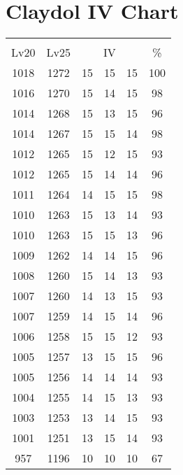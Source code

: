 \documentclass{article}%
\begin{document}
%
\normalsize%
\section{Claydol IV Chart}%
\label{sec:Claydol IV Chart}%
\renewcommand{\arraystretch}{1.5}%
\begin{tabular}{|c|c|c|c|c|c|}%
\hline%
\multicolumn{6}{|c|}{\textcolor{white}{ 
\linebreak{Claydol}
}%
\cellcolor{black}}\\%
\multicolumn{1}{|c}{Lv20}&\multicolumn{1}{c|}{Lv25}&\multicolumn{3}{c|}{IV}&\multicolumn{1}{|c|}{\%}\\%
\hline%
\rowcolor{color100}%
1018&1272&15&15&15&100\\%
\hline%
\rowcolor{color98}%
1016&1270&15&14&15&98\\%
\hline%
\rowcolor{color96}%
1014&1268&15&13&15&96\\%
\hline%
\rowcolor{color98}%
1014&1267&15&15&14&98\\%
\hline%
\rowcolor{color93}%
1012&1265&15&12&15&93\\%
\hline%
\rowcolor{color96}%
1012&1265&15&14&14&96\\%
\hline%
\rowcolor{color98}%
1011&1264&14&15&15&98\\%
\hline%
\rowcolor{color93}%
1010&1263&15&13&14&93\\%
\hline%
\rowcolor{color96}%
1010&1263&15&15&13&96\\%
\hline%
\rowcolor{color96}%
1009&1262&14&14&15&96\\%
\hline%
\rowcolor{color93}%
1008&1260&15&14&13&93\\%
\hline%
\rowcolor{color93}%
1007&1260&14&13&15&93\\%
\hline%
\rowcolor{color96}%
1007&1259&14&15&14&96\\%
\hline%
\rowcolor{color93}%
1006&1258&15&15&12&93\\%
\hline%
\rowcolor{color96}%
1005&1257&13&15&15&96\\%
\hline%
\rowcolor{color93}%
1005&1256&14&14&14&93\\%
\hline%
\rowcolor{color93}%
1004&1255&14&15&13&93\\%
\hline%
\rowcolor{color93}%
1003&1253&13&14&15&93\\%
\hline%
\rowcolor{color93}%
1001&1251&13&15&14&93\\%
\hline%
\rowcolor{color91}%
957&1196&10&10&10&67\\%
\end{tabular}

%
\end{document}
